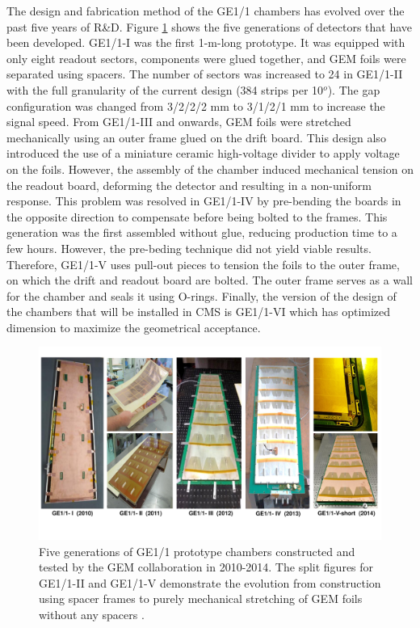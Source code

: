     The design and fabrication method of the GE1/1 chambers has evolved over the past five years of R\&D. Figure \ref{fig:II-1-generations} shows the five generations of detectors that have been developed. GE1/1-I was the first 1-m-long prototype. It was equipped with only eight readout sectors, components were glued together, and GEM foils were separated using spacers. The number of sectors was increased to 24 in GE1/1-II with the full granularity of the current design (384 strips per 10$^o$). The gap configuration was changed from 3/2/2/2 mm to 3/1/2/1 mm to increase the signal speed. From GE1/1-III and onwards, GEM foils were stretched mechanically using an outer frame glued on the drift board. This design also introduced the use of a miniature ceramic high-voltage divider to apply voltage on the foils. However, the assembly of the chamber induced mechanical tension on the readout board, deforming the detector and resulting in a non-uniform response. This problem was resolved in GE1/1-IV by pre-bending the boards in the opposite direction to compensate before being bolted to the frames. This generation was the first assembled without glue, reducing production time to a few hours. However, the pre-beding technique did not yield viable results. Therefore, GE1/1-V uses pull-out pieces to tension the foils to the outer frame, on which the drift and readout board are bolted. The outer frame serves as a wall for the chamber and seals it using O-rings. Finally, the version of the design of the chambers that will be installed in CMS is GE1/1-VI which has optimized dimension to maximize the geometrical acceptance.

    \begin{figure}[h!]
      \centering
      \includegraphics[width=\textwidth]{img/II-1-gem/generations.pdf}
      \caption{Five generations of GE1/1 prototype chambers constructed and tested by the GEM collaboration in 2010-2014. The split figures for GE1/1-II and GE1/1-V demonstrate the evolution from construction using spacer frames to purely mechanical stretching of GEM foils without any spacers \cite{Colaleo:2021453}.}
      \label{fig:II-1-generations}
    \end{figure}

